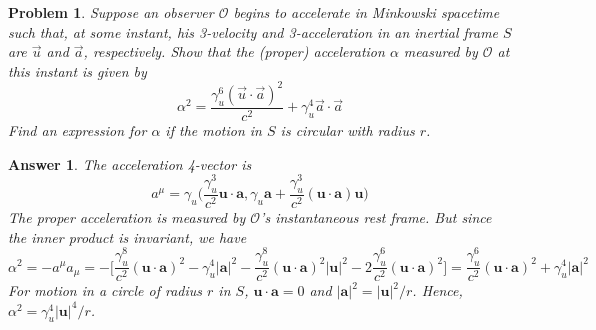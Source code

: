 \documentclass[a4paper]{article}
\newtheorem{ans}{Answer}[subsection]
\theoremstyle{new}
\newtheorem{qns}{Problem}[section]
\begin{document}
\begin{qns}
Suppose an observer $\mathcal{O}$ begins to accelerate in Minkowski spacetime such that, at some instant, his 3-velocity and 3-acceleration in an inertial frame $S$ are $\vec{u}$ and $\vec{a}$, respectively. Show that the (proper) acceleration $\alpha$ measured by $\mathcal{O}$ at this instant is given by
$$\alpha^2=\frac{\gamma_u^6(\vec{u}\cdot\vec{a})^2}{c^2}+\gamma_u^4\vec{a}\cdot\vec{a}$$
Find an expression for $\alpha$ if the motion in $S$ is circular with radius $r$. 
\end{qns}
\begin{ans}
The acceleration 4-vector is
$$a^\mu=\gamma_u\bigg(\frac{\gamma_u^3}{c^2}\mathbf{u}\cdot\mathbf{a},\gamma_u\mathbf{a}+\frac{\gamma_u^3}{c^2}(\mathbf{u}\cdot\mathbf{a})\mathbf{u}\bigg)$$
The proper acceleration is measured by $\mathcal{O}$'s instantaneous rest frame. But since the inner product is invariant, we have
$$\alpha^2=-a^\mu a_\mu=-\bigg[\frac{\gamma_u^8}{c^2}(\mathbf{u}\cdot\mathbf{a})^2-\gamma_u^4|\mathbf{a}|^2-\frac{\gamma_u^8}{c^2}(\mathbf{u}\cdot\mathbf{a})^2|\mathbf{u}|^2-2\frac{\gamma_u^6}{c^2}(\mathbf{u}\cdot\mathbf{a})^2\bigg]=\frac{\gamma_u^6}{c^2}(\mathbf{u}\cdot\mathbf{a})^2+\gamma_u^4|\mathbf{a}|^2$$
For motion in a circle of radius $r$ in $S$, $\mathbf{u}\cdot\mathbf{a}=0$ and $|\mathbf{a}|^2=|\mathbf{u}|^2/r$. Hence, $\alpha^2=\gamma_u^4|\mathbf{u}|^4/r$.
\end{ans}
\newpage
\end{document}
